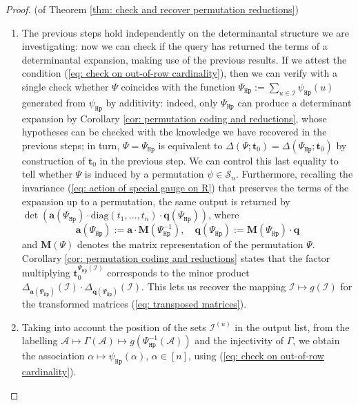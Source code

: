 \documentclass[10pt]{article}
\theoremstyle{remark}%
\theoremstyle{definition}%
\begin{document}
\begin{proof}{(of Theorem \ref{thm: check and recover permutation reductions})}
\begin{enumerate}
\item The previous steps hold independently on the determinantal structure we are investigating: now we can check if the query has returned the terms of a determinantal expansion, making use of the previous results. If we attest the condition (\ref{eq: check on out-of-row cardinality}), then we can verify with a single check whether $\Psi$ coincides with the function $\Psi_{\mathtt{Hp}}:=\sum_{u\in\mathcal{I}}\psi_{\mathtt{Hp}}(u)$ generated from $\psi_{\mathtt{Hp}}$ by additivity: indeed, only $\Psi_{\mathtt{Hp}}$ can produce a determinant expansion by Corollary \ref{cor: permutation coding and reductions}, whose hypotheses can be checked with the knowledge we have recovered in the previous steps; in turn, $\Psi=\Psi_{\mathtt{Hp}}$ is equivalent to $\Delta(\Psi;\mathbf{t}_{0})=\Delta(\Psi_{\mathtt{Hp}};\mathbf{t}_{0})$ by construction of $\mathbf{t}_{0}$ in the previous step. We can control this last equality to tell whether $\Psi$ is induced by a permutation $\psi\in\mathcal{S}_{n}$. Furthermore, recalling the invariance (\ref{eq: action of special gauge on R}) that preserves the terms of the expansion up to a permutation, the same output is returned by $\det(\mathbf{a}(\Psi_{\mathtt{Hp}})\cdot \mathrm{diag}(t_{1},\dots,t_{n})\cdot\mathbf{q}(\Psi_{\mathtt{Hp}}))$, where 
\begin{equation} 
\mathbf{a}(\Psi_{\mathtt{Hp}}):= \mathbf{a}\cdot \mathbf{M}(\Psi_{\mathtt{Hp}}^{-1}),\quad \mathbf{q}(\Psi_{\mathtt{Hp}}):= \mathbf{M}(\Psi_{\mathtt{Hp}})\cdot \mathbf{q}
\label{eq: transposed matrices}
\end{equation}
and $\mathbf{M}(\Psi)$ denotes the matrix representation of the permutation $\Psi$. Corollary \ref{cor: permutation coding and reductions} states that the factor multiplying $\mathbf{t}_{0}^{\Psi_{\mathtt{Hp}}(\mathcal{I})}$ corresponds to the minor product $\Delta_{\mathbf{a}(\Psi_{\mathtt{Hp}})}(\mathcal{I})\cdot\Delta_{\mathbf{q}(\Psi_{\mathtt{Hp}})}(\mathcal{I})$. This lets us recover the mapping $\mathcal{I}\mapsto g({\mathcal{I}})$ for the transformed matrices (\ref{eq: transposed matrices}). 
\item Taking into account the position of the sets $\mathcal{I}^{(u)}$ in the output list, from the labelling $\mathcal{A}\mapsto\Gamma(\mathcal{A})\mapsto g(\Psi_{\mathtt{Hp}}^{-1}(\mathcal{A}))$ and the injectivity of $\Gamma$, we obtain the association $\alpha\mapsto \psi_{\mathtt{Hp}}(\alpha)$, $\alpha\in[n]$, using (\ref{eq: check on out-of-row cardinality}).

\end{enumerate}
\end{proof}
\end{document}
